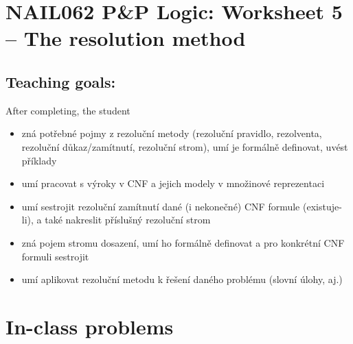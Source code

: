 \section*{NAIL062 P\&P Logic: Worksheet 5 -- The resolution method}


\subsection*{Teaching goals:} After completing, the student

    \begin{itemize}\setlength{\itemsep}{0pt}
        \item zná potřebné pojmy z rezoluční metody (rezoluční pravidlo, rezolventa, rezoluční důkaz/zamítnutí, rezoluční strom), umí je formálně definovat, uvést příklady
        \item umí pracovat s výroky v CNF a jejich modely v množinové reprezentaci
        \item umí sestrojit rezoluční zamítnutí dané (i nekonečné) CNF formule (existuje-li), a také nakreslit příslušný rezoluční strom
        \item zná pojem stromu dosazení, umí ho formálně definovat a pro konkrétní CNF formuli sestrojit
        \item umí aplikovat rezoluční metodu k řešení daného problému (slovní úlohy, aj.)
    \end{itemize}
    

\section*{In-class problems}


